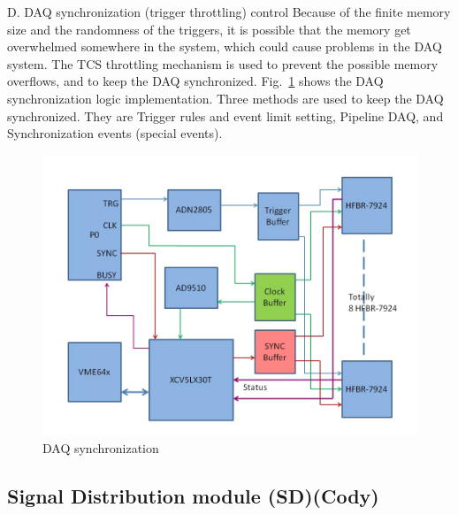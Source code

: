 D.	DAQ synchronization (trigger throttling) control
Because of the finite memory size and the randomness of the triggers, it is possible that the memory get overwhelmed somewhere in the system, which could cause problems in the DAQ system.   The TCS throttling mechanism is used to prevent the possible memory overflows, and to keep the DAQ synchronized.  Fig.~\ref{fig:DAQ_synchronization} shows the DAQ synchronization logic implementation.  Three methods are used to keep the DAQ synchronized.  They are Trigger rules and event limit setting, Pipeline DAQ, and Synchronization events (special events).

\begin{figure}[hbt]
	\centering
	\includegraphics[width=1.0\columnwidth,keepaspectratio]{img/TDdiagram.jpg}
	\caption{DAQ synchronization}
	\label{fig:DAQ_synchronization}
\end{figure}



	
\subsection{Signal Distribution module (SD)(Cody)}

